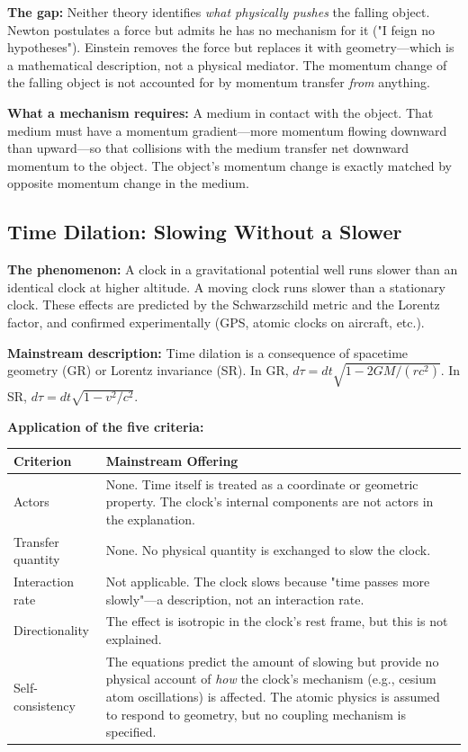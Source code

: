\documentclass[12pt, a4paper]{article}
\begin{document}
\textbf{The gap:} Neither theory identifies \textit{what physically pushes} the falling object. Newton postulates a force but admits he has no mechanism for it ("I feign no hypotheses"). Einstein removes the force but replaces it with geometry—which is a mathematical description, not a physical mediator. The momentum change of the falling object is not accounted for by momentum transfer \textit{from} anything.

\textbf{What a mechanism requires:} A medium in contact with the object. That medium must have a momentum gradient—more momentum flowing downward than upward—so that collisions with the medium transfer net downward momentum to the object. The object's momentum change is exactly matched by opposite momentum change in the medium.

\subsection{Time Dilation: Slowing Without a Slower}
\label{subsec:timedilation_gap}

\textbf{The phenomenon:} A clock in a gravitational potential well runs slower than an identical clock at higher altitude. A moving clock runs slower than a stationary clock. These effects are predicted by the Schwarzschild metric and the Lorentz factor, and confirmed experimentally (GPS, atomic clocks on aircraft, etc.).

\textbf{Mainstream description:} Time dilation is a consequence of spacetime geometry (GR) or Lorentz invariance (SR). In GR, \( d\tau = dt \sqrt{1 - 2GM/(rc^2)} \). In SR, \( d\tau = dt \sqrt{1 - v^2/c^2} \).

\textbf{Application of the five criteria:}

\begin{center}
\begin{tabular}{|p{3cm}|p{10cm}|}
\hline
\textbf{Criterion} & \textbf{Mainstream Offering} \\
\hline
Actors & None. Time itself is treated as a coordinate or geometric property. The clock's internal components are not actors in the explanation. \\
\hline
Transfer quantity & None. No physical quantity is exchanged to slow the clock. \\
\hline
Interaction rate & Not applicable. The clock slows because "time passes more slowly"—a description, not an interaction rate. \\
\hline
Directionality & The effect is isotropic in the clock's rest frame, but this is not explained. \\
\hline
Self-consistency & The equations predict the amount of slowing but provide no physical account of \textit{how} the clock's mechanism (e.g., cesium atom oscillations) is affected. The atomic physics is assumed to respond to geometry, but no coupling mechanism is specified. \\
\hline
\end{tabular}
\end{center}
\end{document}
